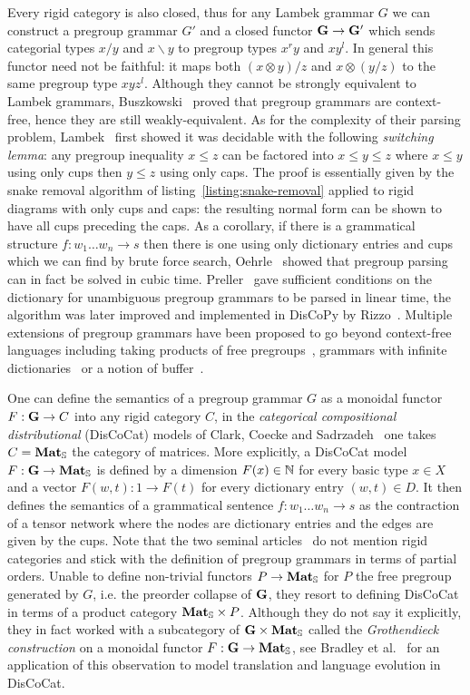 Every rigid category is also closed, thus for any Lambek grammar $G$ we can construct a pregroup grammar $G'$ and a closed functor $\G \to \G'$ which sends categorial types $x / y$ and $x \backslash y$ to pregroup types $x^r y$ and $x y^l$.
In general this functor need not be faithful: it maps both $(x \otimes y) / z$ and $x \otimes (y / z)$ to the same pregroup type $x y z^l$.
Although they cannot be strongly equivalent to Lambek grammars, Buszkowski~\cite{Buszkowski01} proved that pregroup grammars are context-free, hence they are still weakly-equivalent.
As for the complexity of their parsing problem, Lambek~\cite{Lambek99} first showed it was decidable with the following \emph{switching lemma}: any pregroup inequality $x \leq z$ can be factored into $x \leq y \leq z$ where $x \leq y$ using only cups then $y \leq z$ using only caps.
The proof is essentially given by the snake removal algorithm of listing~\ref{listing:snake-removal} applied to rigid diagrams with only cups and caps: the resulting normal form can be shown to have all cups preceding the caps.
As a corollary, if there is a grammatical structure $f : w_1 \dots w_n \to s$ then there is one using only dictionary entries and cups which we can find by brute force search, Oehrle~\cite{Oehrle04} showed that pregroup parsing can in fact be solved in cubic time.
Preller~\cite{Preller07a} gave sufficient conditions on the dictionary for unambiguous pregroup grammars to be parsed in linear time, the algorithm was later improved and implemented in DisCoPy by Rizzo~\cite{Rizzo21}.
Multiple extensions of pregroup grammars have been proposed to go beyond context-free languages including taking products of free pregroups~\cite[Section~28]{Lambek08}, grammars with infinite dictionaries~\cite{Preller10} or a notion of buffer~\cite{GenkinEtAl10}.

One can define the semantics of a pregroup grammar $G$ as a monoidal functor $F : \G \to C$ into any rigid category $C$, in the \emph{categorical compositional distributional} (DisCoCat) models of Clark, Coecke and Sadrzadeh~\cite{ClarkEtAl08,ClarkEtAl10} one takes $C = \mathbf{Mat}_\S$ the category of matrices.
More explicitly, a DisCoCat model $F : \G \to \mathbf{Mat}_\S$ is defined by a dimension $F(x) \in \N$ for every basic type $x \in X$ and a vector $F(w, t) : 1 \to F(t)$ for every dictionary entry $(w, t) \in D$.
It then defines the semantics of a grammatical sentence $f : w_1 \dots w_n \to s$ as the contraction of a tensor network where the nodes are dictionary entries and the edges are given by the cups.
Note that the two seminal articles~\cite{ClarkEtAl08,ClarkEtAl10} do not mention rigid categories and stick with the definition of pregroup grammars in terms of partial orders.
Unable to define non-trivial functors $P \to \mathbf{Mat}_\S$ for $P$ the free pregroup generated by $G$, i.e. the preorder collapse of $\G$, they resort to defining DisCoCat in terms of a product category $\mathbf{Mat}_\S \times P$.
Although they do not say it explicitly, they in fact worked with a subcategory of $\G \times \mathbf{Mat}_\S$ called the \emph{Grothendieck construction} on a monoidal functor $F : \G \to \mathbf{Mat}_\S$, see Bradley et al.~\cite{BradleyEtAl18} for an application of this observation to model translation and language evolution in DisCoCat.

